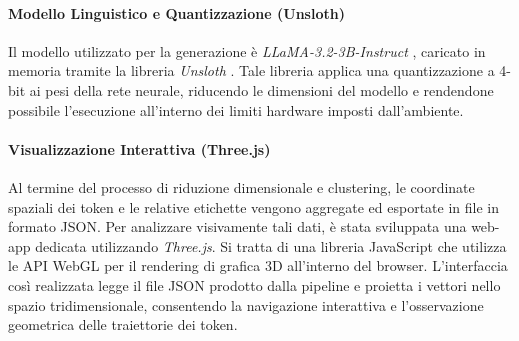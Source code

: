 \paragraph{Modello Linguistico e Quantizzazione (Unsloth)}
Il modello utilizzato per la generazione è \textit{LLaMA-3.2-3B-Instruct} \cite{dubey2024llama3}, caricato in memoria tramite la libreria \textit{Unsloth} \cite{unsloth_guide_2025}. Tale libreria applica una quantizzazione a 4-bit ai pesi della rete neurale, riducendo le dimensioni del modello e rendendone possibile l'esecuzione all'interno dei limiti hardware imposti dall'ambiente.

\paragraph{Visualizzazione Interattiva (Three.js)}
Al termine del processo di riduzione dimensionale e clustering, le coordinate spaziali dei token e le relative etichette vengono aggregate ed esportate in file in formato JSON. Per analizzare visivamente tali dati, è stata sviluppata una web-app dedicata utilizzando \textit{Three.js}. Si tratta di una libreria JavaScript che utilizza le API WebGL per il rendering di grafica 3D all'interno del browser. L'interfaccia così realizzata legge il file JSON prodotto dalla pipeline e proietta i vettori nello spazio tridimensionale, consentendo la navigazione interattiva e l'osservazione geometrica delle traiettorie dei token.